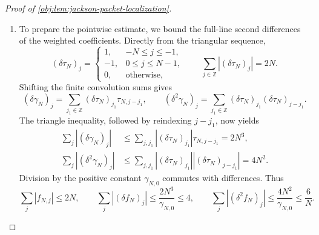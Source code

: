 \documentclass[11pt]{article}
\begin{document}
\begin{proof}[Proof of \cref{obj:lem:jackson-packet-localization}]
\begin{enumerate}
\item To prepare the pointwise estimate, we bound the full-line second differences of the weighted coefficients. Directly from the triangular sequence,
\[
(\delta\tau_N)_j=
\begin{cases}
1,&-N\leq j\leq-1,\\
-1,&0\leq j\leq N-1,\\
0,&\text{otherwise},
\end{cases}
\qquad
\sum_{j\in\mathbb Z}|(\delta\tau_N)_j|=2N.
\]
Shifting the finite convolution sums gives
\[
(\delta\gamma_N)_j
=\sum_{j_1\in\mathbb Z}
(\delta\tau_N)_{j_1}\tau_{N,j-j_1},
\qquad
(\delta^2\gamma_N)_j
=\sum_{j_1\in\mathbb Z}
(\delta\tau_N)_{j_1}(\delta\tau_N)_{j-j_1}.
\]
The triangle inequality, followed by reindexing \(j-j_1\), now yields
\[
\begin{aligned}
\sum_j|(\delta\gamma_N)_j|
&\leq
\sum_{j,j_1}|(\delta\tau_N)_{j_1}|\tau_{N,j-j_1}
=2N^3,\\
\sum_j|(\delta^2\gamma_N)_j|
&\leq
\sum_{j,j_1}|(\delta\tau_N)_{j_1}|
                 |(\delta\tau_N)_{j-j_1}|
=4N^2.
\end{aligned}
\]
Division by the positive constant \(\gamma_{N,0}\) commutes with differences. Thus
\[
\sum_j|f_{N,j}|\leq2N,\qquad
\sum_j|(\delta f_N)_j|
\leq\frac{2N^3}{\gamma_{N,0}}\leq4,\qquad
\sum_j|(\delta^2f_N)_j|
\leq\frac{4N^2}{\gamma_{N,0}}\leq\frac6N.
\]


\end{enumerate}
\end{proof}
\end{document}
